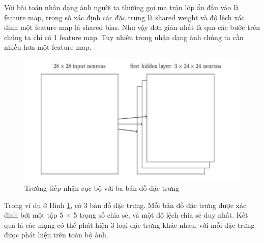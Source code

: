 Với bài toán nhận dạng ảnh người ta thường gọi ma trận lớp ẩn đầu vào là feature map, trọng số xác định các đặc trưng là shared weight và độ lệch xác định một feature map là shared bias. Như vậy đơn giản nhất là qua các bước trên chúng ta chỉ có 1 feature map. Tuy nhiên trong nhận dạng ảnh chúng ta cần nhiều hơn một feature map.
\begin{figure}[H]
	\centering
	\includegraphics[width=0.8\linewidth]{images/babandodactrung.png}
	\caption{Trường tiếp nhận cục bộ với ba bản đồ đặc trưng}
	\label{fig:babandodactrung}
\end{figure}
Trong ví dụ ở Hình \ref{fig:babandodactrung}, có 3 bản đồ đặc trưng. Mỗi bản đồ đặc trưng được xác định bởi một tập 5 × 5 trọng số chia sẻ, và một độ lệch chia sẻ duy nhất. Kết quả là các mạng có thể phát hiện 3 loại đặc trưng khác nhau, với mỗi đặc trưng được phát hiện trên toàn bộ ảnh. 


